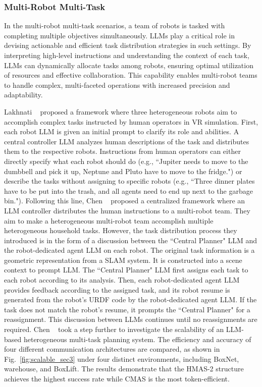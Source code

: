\subsubsection{Multi-Robot Multi-Task} 
In the multi-robot multi-task scenarios, a team of robots is tasked with completing multiple objectives simultaneously. LLMs play a critical role in devising actionable and efficient task distribution strategies in such settings. By interpreting high-level instructions and understanding the context of each task, LLMs can dynamically allocate tasks among robots, ensuring optimal utilization of resources and effective collaboration. This capability enables multi-robot teams to handle complex, multi-faceted operations with increased precision and adaptability. 

Lakhnati \etal~\cite{lakhnati_exploring_2024} proposed a framework where three heterogeneous robots aim to accomplish complex tasks instructed by human operators in VR simulation. First, each robot LLM is given an initial prompt to clarify its role and abilities. A central controller LLM analyzes human descriptions of the task and distributes them to the respective robots. Instructions from human operators can either directly specify what each robot should do (e.g., ``Jupiter needs to move to the dumbbell and pick it up, Neptune and Pluto have to move to the fridge.") or describe the tasks without assigning to specific robots (e.g., ``Three dinner plates have to be put into the trash, and all agents need to end up next to the garbage bin.").
Following this line, Chen \etal~\cite{chen_emos_2024} proposed a centralized framework where an LLM controller distributes the human instructions to a multi-robot team. They aim to make a heterogeneous multi-robot team accomplish multiple heterogeneous household tasks. However, the task distribution process they introduced is in the form of a discussion between the ``Central Planner" LLM and the robot-dedicated agent LLM on each robot. The original task information is a geometric representation from a SLAM system. It is constructed into a scene context to prompt LLM. The ``Central Planner" LLM first assigns each task to each robot according to its analysis. Then, each robot-dedicated agent LLM provides feedback according to the assigned task, and its robot resume is generated from the robot's URDF code by the robot-dedicated agent LLM. If the task does not match the robot's resume, it prompts the ``Central Planner" for a reassignment. This discussion between LLMs continues until no reassignments are required. 
Chen \etal~\cite{chen_scalable_2024} took a step further to investigate the scalability of an LLM-based heterogeneous multi-task planning system. The efficiency and accuracy of four different communication architectures are compared, as shown in Fig.~\ref{fig:scalable_sec3} under four distinct environments, including BoxNet, warehouse, and BoxLift. The results demonstrate that the HMAS-2 structure achieves the highest success rate while CMAS is the most token-efficient. 
